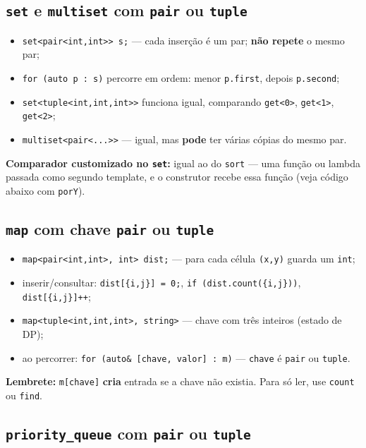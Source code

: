 \subsection{\texttt{set} e \texttt{multiset} com \texttt{pair} ou \texttt{tuple}}

\begin{itemize}[nosep]
  \item \texttt{set<pair<int,int>> s;} --- cada inserção é um par; \textbf{não repete} o mesmo par;
  \item \texttt{for (auto p : s)} percorre em ordem: menor \texttt{p.first}, depois \texttt{p.second};
  \item \texttt{set<tuple<int,int,int>>} funciona igual, comparando \texttt{get<0>}, \texttt{get<1>}, \texttt{get<2>};
  \item \texttt{multiset<pair<...>>} --- igual, mas \textbf{pode} ter várias cópias do mesmo par.
\end{itemize}

\textbf{Comparador customizado no \texttt{set}:} igual ao do \texttt{sort} --- uma função ou lambda passada como segundo template, e o construtor recebe essa função (veja código abaixo com \texttt{porY}).

\subsection{\texttt{map} com chave \texttt{pair} ou \texttt{tuple}}

\begin{itemize}[nosep]
  \item \texttt{map<pair<int,int>, int> dist;} --- para cada célula \texttt{(x,y)} guarda um \texttt{int};
  \item inserir/consultar: \texttt{dist[\{i,j\}] = 0;}, \texttt{if (dist.count(\{i,j\}))}, \texttt{dist[\{i,j\}]++};
  \item \texttt{map<tuple<int,int,int>, string>} --- chave com três inteiros (estado de DP);
  \item ao percorrer: \texttt{for (auto\& [chave, valor] : m)} --- \texttt{chave} é \texttt{pair} ou \texttt{tuple}.
\end{itemize}

\textbf{Lembrete:} \texttt{m[chave]} \textbf{cria} entrada se a chave não existia. Para só ler, use \texttt{count} ou \texttt{find}.

\subsection{\texttt{priority\_queue} com \texttt{pair} ou \texttt{tuple}}

